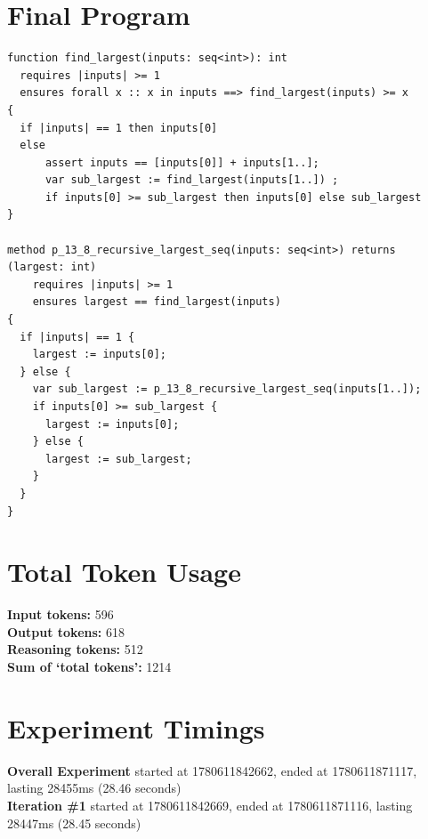 \documentclass{article}
\begin{document}
\section*{Final Program}
\begin{lstlisting}
function find_largest(inputs: seq<int>): int
  requires |inputs| >= 1
  ensures forall x :: x in inputs ==> find_largest(inputs) >= x
{
  if |inputs| == 1 then inputs[0]
  else 
      assert inputs == [inputs[0]] + inputs[1..];
      var sub_largest := find_largest(inputs[1..]) ;
      if inputs[0] >= sub_largest then inputs[0] else sub_largest
}

method p_13_8_recursive_largest_seq(inputs: seq<int>) returns (largest: int)
	requires |inputs| >= 1
	ensures largest == find_largest(inputs)
{
  if |inputs| == 1 {
    largest := inputs[0];
  } else {
    var sub_largest := p_13_8_recursive_largest_seq(inputs[1..]);
    if inputs[0] >= sub_largest {
      largest := inputs[0];
    } else {
      largest := sub_largest;
    }
  }
}
\end{lstlisting}
\section*{Total Token Usage}
\textbf{Input tokens: }596
\\\textbf{Output tokens: }618
\\\textbf{Reasoning tokens: }512
\\\textbf{Sum of `total tokens': }1214
\section*{Experiment Timings}
\textbf{Overall Experiment} started at 1780611842662, ended at 1780611871117, lasting 28455ms (28.46 seconds)
\\\textbf{Iteration \#1} started at 1780611842669, ended at 1780611871116, lasting 28447ms (28.45 seconds)
\end{document}

